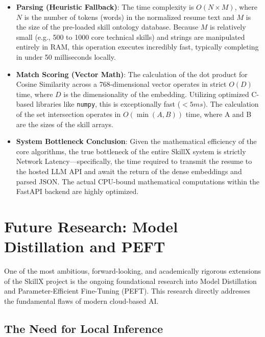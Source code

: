 \documentclass[12pt,a4paper]{report}
\begin{document}
\begin{itemize}
    \item \textbf{Parsing (Heuristic Fallback)}: The time complexity is $O(N \times M)$, where $N$ is the number of tokens (words) in the normalized resume text and $M$ is the size of the pre-loaded skill ontology database. Because $M$ is relatively small (e.g., 500 to 1000 core technical skills) and strings are manipulated entirely in RAM, this operation executes incredibly fast, typically completing in under 50 milliseconds locally.
    \item \textbf{Match Scoring (Vector Math)}: The calculation of the dot product for Cosine Similarity across a 768-dimensional vector operates in strict $O(D)$ time, where $D$ is the dimensionality of the embedding. Utilizing optimized C-based libraries like \texttt{numpy}, this is exceptionally fast ($<5ms$). The calculation of the set intersection operates in $O(\min(A, B))$ time, where A and B are the sizes of the skill arrays.
    \item \textbf{System Bottleneck Conclusion}: Given the mathematical efficiency of the core algorithms, the true bottleneck of the entire SkillX system is strictly Network Latency---specifically, the time required to transmit the resume to the hosted LLM API and await the return of the dense embeddings and parsed JSON. The actual CPU-bound mathematical computations within the FastAPI backend are highly optimized.
\end{itemize}

\chapter{Future Research: Model Distillation and PEFT}

One of the most ambitious, forward-looking, and academically rigorous extensions of the SkillX project is the ongoing foundational research into Model Distillation and Parameter-Efficient Fine-Tuning (PEFT). This research directly addresses the fundamental flaws of modern cloud-based AI.

\section{The Need for Local Inference}
\end{document}
